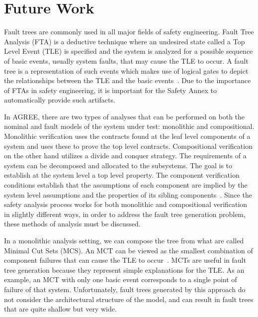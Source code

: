 \section{Future Work}
\label{sec:future_work}

Fault trees are commonly used in all major fields of safety engineering. Fault Tree Analysis (FTA) is a deductive technique where an undesired state called a Top Level Event (TLE) is specified and the system is analyzed for a possible sequence of basic events, usually system faults, that may cause the TLE to occur. A fault tree is a representation of such events which makes use of logical gates to depict the relationships between the TLE and the basic events~\cite{FTATechReport,Bozzano:2010:DSA:1951720}. Due to the importance of FTAs in safety engineering, it is important for the Safety Annex to automatically provide such artifacts. 

In AGREE, there are two types of analyses that can be performed on both the nominal and fault models of the system under test: monolithic and compositional. Monolithic verification uses the contracts found at the leaf level components of a system and uses these to prove the top level contracts. Compositional verification on the other hand utilizes a divide and conquer strategy. The requirements of a system can be decomposed and allocated to the subsystems. The goal is to establish at the system level a top level property. The component verification conditions establish that the assumptions of each component are implied by the system level assumptions and the properties of its sibling components~\cite{hilt2013:MuWhRaHe,QFCS15:backes,NFM2012:CoGaMiWhLaLu}. Since the safety analysis process works for both monolithic and compositional verification in slightly different ways, in order to address the fault tree generation problem, these methods of analysis must be discussed. 

In a monolithic analysis setting, we can compose the tree from what are called Minimal Cut Sets (MCS). An MCT can be viewed as the smallest combination of component failures that can cause the TLE to occur~\cite{Bozzano:2010:DSA:1951720}. MCTs are useful in fault tree generation because they represent simple explanations for the TLE. As an example, an MCT with only one basic event corresponds to a single point of failure of that system. Unfortunately, fault trees generated by this approach do not consider the architectural structure of the model, and can result in fault trees that are quite shallow but very wide. 

